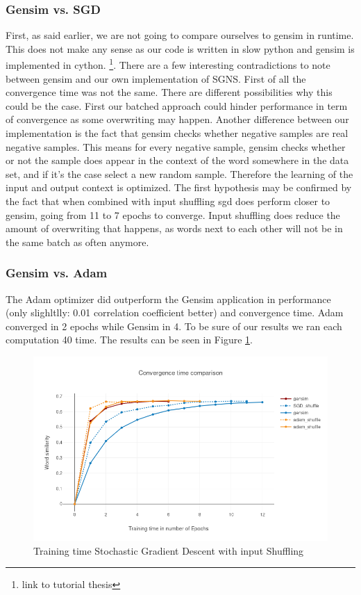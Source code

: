\subsubsection{Gensim vs. SGD}
First, as said earlier, we are not going to compare ourselves to gensim in runtime. This does not make any sense as our code is written in slow python and gensim is implemented in cython. \footnote{link to tutorial thesis}. 
There are a few interesting contradictions to note between gensim and our own implementation of SGNS. First of all the convergence time was not the same. There are different possibilities why this could be the case. First our batched approach could hinder performance in term of convergence as some overwriting may happen. Another difference between our implementation is the fact that gensim checks whether negative samples are real negative samples. This means for every negative sample, gensim checks whether or not the sample does appear in the context of the word somewhere in the data set, and if it's the case select a new random sample. Therefore the learning of the input and output context is optimized. 
The first hypothesis may be confirmed by the fact that when combined with input shuffling sgd does perform closer to gensim, going from 11 to 7 epochs to converge. Input shuffling does reduce the amount of overwriting that happens, as words next to each other will not be in the same batch as often anymore. 

\subsubsection{Gensim vs. Adam}
The Adam optimizer did outperform the Gensim application in performance (only slighltlly: 0.01 correlation coefficient better) and convergence time. Adam converged in 2 epochs while Gensim in 4. To be sure of our results we ran each computation 40 time. The results can be  seen in Figure \ref{fig:gensim_vs_adam}.


\begin{figure}[H]
    \centering
			\includegraphics[scale=0.45]{images/gensim_vs_adam} 
    \caption{Training time Stochastic Gradient Descent with input Shuffling}
    \label{fig:gensim_vs_adam}
\end{figure}


